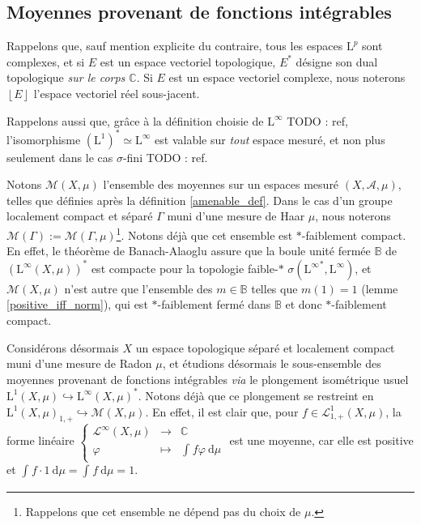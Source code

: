 \documentclass[a4paper,12pt]{article}
\newcommand{\C}{\mathbb{C}}
\newcommand{\norm}[1]{\left\Vert #1\right\Vert}
\newcommand{\floor}[1]{\left\lfloor #1 \right\rfloor}
\newcommand{\integral}[4]{\int_{#1}^{#2} #3~\mathrm{d}#4}
\newcommand\funlam[2]{\left\{\begin{array}{ccc}#1\\#2\end{array}\right.}
\newcommand{\nhds}{\mathcal{N}}
\newcommand{\TODO}[1]{{\color{red}TODO :} #1}
\begin{document}

\subsection{Moyennes provenant de fonctions intégrables}

Rappelons que, sauf mention explicite du contraire, tous les espaces $\mathrm{L}^p$ sont complexes, et
si $E$ est un espace vectoriel topologique, $E^*$ désigne son dual topologique \emph{sur le corps $\C$}. Si
$E$ est un espace vectoriel complexe, nous noterons $\floor{E}$ l'espace vectoriel réel sous-jacent.

Rappelons aussi que, grâce à la définition choisie de $\mathrm{L}^\infty$ \TODO{ref}, l'isomorphisme $(\mathrm{L}^1)^* \simeq \mathrm{L}^\infty$
est valable sur \emph{tout} espace mesuré, et non plus seulement dans le cas $\sigma$-fini \TODO{ref}.

Notons $\mathcal{M}(X,\mu)$ l'ensemble des moyennes sur un espaces mesuré $(X,\mathcal{A},\mu)$, telles que définies après la définition \ref{amenable_def}.
Dans le cas d'un groupe localement compact et séparé $\Gamma$ muni d'une mesure de Haar $\mu$, nous noterons
$\mathcal{M}(\Gamma):=\mathcal{M}(\Gamma, \mu)$\footnote{Rappelons que cet ensemble ne dépend pas du choix de $\mu$.}. Notons déjà que cet ensemble est
$\ast$-faiblement compact. En effet, le théorème de Banach-Alaoglu assure que la boule unité fermée $\mathbb{B}$
de $\left(\mathrm{L}^\infty(X, \mu)\right)^*$ est compacte pour la topologie faible-$*$ $\sigma({\mathrm{L}^\infty}^*, \mathrm{L}^\infty)$,
et $\mathcal{M}(X, \mu)$ n'est autre que l'ensemble des $m\in\mathbb{B}$ telles que $m(1) = 1$ (lemme \ref{positive_iff_norm}),
qui est $*$-faiblement fermé dans $\mathbb{B}$ et donc $*$-faiblement compact.

Considérons désormais $X$ un espace topologique séparé et localement compact muni d'une mesure de Radon $\mu$, et 
étudions désormais le sous-ensemble des moyennes provenant de fonctions intégrables \emph{via} le plongement isométrique usuel $\mathrm{L}^1(X,\mu)\hookrightarrow\mathrm{L}^\infty(X,\mu)^*$.
Notons déjà que ce plongement se restreint en $\mathrm{L}^1(X, \mu)_{1, +}\hookrightarrow \mathcal{M}(X, \mu)$.
En effet, il est clair que, pour $f\in\mathscr{L}^1_{1, +}(X, \mu)$, la forme linéaire $\funlam{\mathscr{L}^\infty(X,\mu)&\to&\C}{ \varphi &\mapsto&\integral{}{}{f\varphi}{\mu}}$ est une moyenne,
car elle est positive et $\integral{}{}{f\cdot 1}{\mu} = \integral{}{}{f}{\mu} = 1$.
\end{document}
